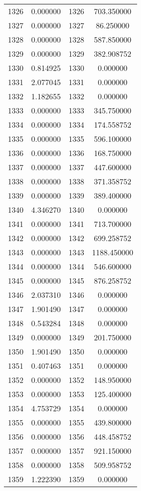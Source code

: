 \documentclass[12pt]{article}
\begin{document}
\begin{longtable}{@{}cccc@{}}
1326 & 0.000000 & 1326 & 703.350000 \\
1327 & 0.000000 & 1327 & 86.250000 \\
1328 & 0.000000 & 1328 & 587.850000 \\
1329 & 0.000000 & 1329 & 382.908752 \\
1330 & 0.814925 & 1330 & 0.000000 \\
1331 & 2.077045 & 1331 & 0.000000 \\
1332 & 1.182655 & 1332 & 0.000000 \\
1333 & 0.000000 & 1333 & 345.750000 \\
1334 & 0.000000 & 1334 & 174.558752 \\
1335 & 0.000000 & 1335 & 596.100000 \\
1336 & 0.000000 & 1336 & 168.750000 \\
1337 & 0.000000 & 1337 & 447.600000 \\
1338 & 0.000000 & 1338 & 371.358752 \\
1339 & 0.000000 & 1339 & 389.400000 \\
1340 & 4.346270 & 1340 & 0.000000 \\
1341 & 0.000000 & 1341 & 713.700000 \\
1342 & 0.000000 & 1342 & 699.258752 \\
1343 & 0.000000 & 1343 & 1188.450000 \\
1344 & 0.000000 & 1344 & 546.600000 \\
1345 & 0.000000 & 1345 & 876.258752 \\
1346 & 2.037310 & 1346 & 0.000000 \\
1347 & 1.901490 & 1347 & 0.000000 \\
1348 & 0.543284 & 1348 & 0.000000 \\
1349 & 0.000000 & 1349 & 201.750000 \\
1350 & 1.901490 & 1350 & 0.000000 \\
1351 & 0.407463 & 1351 & 0.000000 \\
1352 & 0.000000 & 1352 & 148.950000 \\
1353 & 0.000000 & 1353 & 125.400000 \\
1354 & 4.753729 & 1354 & 0.000000 \\
1355 & 0.000000 & 1355 & 439.800000 \\
1356 & 0.000000 & 1356 & 448.458752 \\
1357 & 0.000000 & 1357 & 921.150000 \\
1358 & 0.000000 & 1358 & 509.958752 \\
1359 & 1.222390 & 1359 & 0.000000 \\

\end{longtable}
\end{document}
